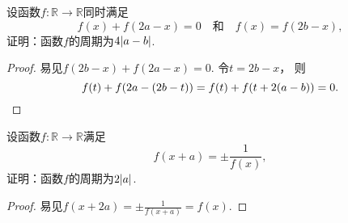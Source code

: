 \begin{example}
设函数\(f\colon\mathbb{R}\to\mathbb{R}\)同时满足\begin{equation*}
	f(x)+f(2a-x)=0
	\quad\text{和}\quad
	f(x)=f(2b-x),
\end{equation*}
证明：函数\(f\)的周期为\(4\abs{a-b}\).
\begin{proof}
易见\(f(2b-x)+f(2a-x)=0\).
令\(t=2b-x\)，
则\begin{equation*}
	f(t)+f(2a-(2b-t))
	=f(t)+f(t+2(a-b))
	=0.
	\qedhere
\end{equation*}
\end{proof}
\end{example}

\begin{example}
设函数\(f\colon\mathbb{R}\to\mathbb{R}\)满足\begin{equation*}
	f(x+a)=\pm\frac1{f(x)},
\end{equation*}
证明：函数\(f\)的周期为\(2\abs{a}\).
\begin{proof}
易见\(f(x+2a)=\pm\frac1{f(x+a)}=f(x)\).
\end{proof}
\end{example}
